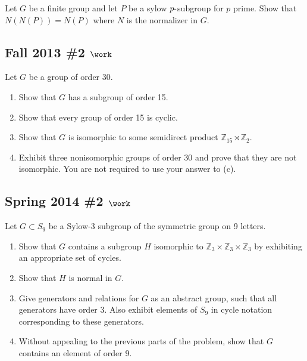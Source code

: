 Let \(G\) be a finite group and let \(P\) be a sylow
\(p{\hbox{-}}\)subgroup for \(p\) prime. Show that \(N(N(P)) = N(P)\)
where \(N\) is the normalizer in \(G\).

\hypertarget{fall-2013-2-work}{%
\subsection{\texorpdfstring{Fall 2013 \#2
\(\work\)}{Fall 2013 \#2 \textbackslash work}}\label{fall-2013-2-work}}

Let \(G\) be a group of order 30.

\begin{enumerate}
\def\labelenumi{\alph{enumi}.}
\item
  Show that \(G\) has a subgroup of order 15.
\item
  Show that every group of order 15 is cyclic.
\item
  Show that \(G\) is isomorphic to some semidirect product
  \({\mathbb{Z}}_{15} \rtimes{\mathbb{Z}}_2\).
\item
  Exhibit three nonisomorphic groups of order 30 and prove that they are
  not isomorphic. You are not required to use your answer to (c).
\end{enumerate}

\hypertarget{spring-2014-2-work}{%
\subsection{\texorpdfstring{Spring 2014 \#2
\(\work\)}{Spring 2014 \#2 \textbackslash work}}\label{spring-2014-2-work}}

Let \(G\subset S_9\) be a Sylow-3 subgroup of the symmetric group on 9
letters.

\begin{enumerate}
\def\labelenumi{\alph{enumi}.}
\item
  Show that \(G\) contains a subgroup \(H\) isomorphic to
  \({\mathbb{Z}}_3 \times{\mathbb{Z}}_3 \times{\mathbb{Z}}_3\) by
  exhibiting an appropriate set of cycles.
\item
  Show that \(H\) is normal in \(G\).
\item
  Give generators and relations for \(G\) as an abstract group, such
  that all generators have order 3. Also exhibit elements of \(S_9\) in
  cycle notation corresponding to these generators.
\item
  Without appealing to the previous parts of the problem, show that
  \(G\) contains an element of order 9.
\end{enumerate}

